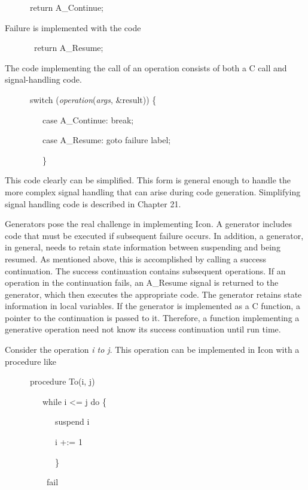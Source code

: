 {\ttfamily\mdseries
\ \ \ \ \ \ return A\_Continue;}


\noindent Failure is implemented with the code 

{\ttfamily\mdseries
\ \ \ \ \ \ \ return A\_Resume;}


\noindent The code implementing the call of an operation consists of
both a C call and signal-handling code.

{\ttfamily\mdseries
\ \ \ \ \ \ switch (\textit{operation}(\textit{args}, \&result)) \{}

{\ttfamily\mdseries
\ \ \ \ \ \ \ \ \ case A\_Continue: break;}

{\ttfamily\mdseries
\ \ \ \ \ \ \ \ \ case A\_Resume: goto failure label;}

{\ttfamily\mdseries
\ \ \ \ \ \ \ \ \ \}}


This code clearly can be simplified. This form is general enough to
handle the more complex signal handling that can arise during code
generation. Simplifying signal handling code is described in Chapter
21.


Generators pose the real challenge in implementing Icon. A generator
includes code that must be executed if subsequent failure occurs. In
addition, a generator, in general, needs to retain state information
between suspending and being resumed. As mentioned above, this is
accomplished by calling a success continuation. The success
continuation contains subsequent operations. If an operation in the
continuation fails, an A\_Resume signal is returned to the generator,
which then executes the appropriate code. The generator retains state
information in local variables. If the generator is implemented as a C
function, a pointer to the continuation is passed to it. Therefore, a
function implementing a generative operation need not know its success
continuation until run time.


Consider the operation \textit{i to j}. This operation can be implemented in Icon with a procedure like 

{\ttfamily\mdseries
\ \ \ \ \ \ procedure To(i, j)}

{\ttfamily\mdseries
\ \ \ \ \ \ \ \ \ while i {\textless}= j do \{}

{\ttfamily\mdseries
\ \ \ \ \ \ \ \ \ \ \ \ suspend i}

{\ttfamily\mdseries
\ \ \ \ \ \ \ \ \ \ \ \ i +:= 1}

{\ttfamily\mdseries
\ \ \ \ \ \ \ \ \ \ \ \ \}}

{\ttfamily\mdseries
\ \ \ \ \ \ \ \ \ \ fail}

